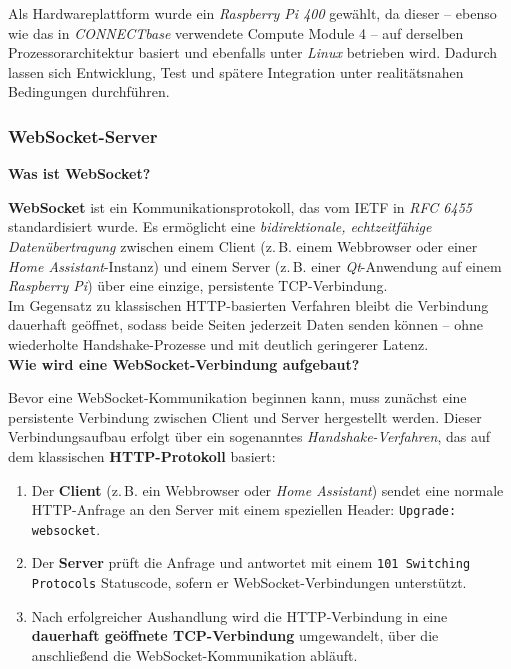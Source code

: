 Als Hardwareplattform wurde ein \textit{Raspberry Pi 400} gewählt, da dieser – ebenso wie das in \textit{CONNECTbase} verwendete Compute Module 4 – auf derselben Prozessorarchitektur basiert und ebenfalls unter \textit{Linux} betrieben wird. Dadurch lassen sich Entwicklung, Test und spätere Integration unter realitätsnahen Bedingungen durchführen.

\subsubsection{WebSocket-Server}

{\large \textbf{Was ist WebSocket?}} 

\textbf{WebSocket} ist ein Kommunikationsprotokoll, das vom IETF in \textit{RFC 6455} standardisiert wurde. Es ermöglicht eine \textit{bidirektionale, echtzeitfähige Datenübertragung} zwischen einem Client (z.\,B. einem Webbrowser oder einer \textit{Home Assistant}-Instanz) und einem Server (z.\,B. einer \textit{Qt}-Anwendung auf einem \textit{Raspberry Pi}) über eine einzige, persistente TCP-Verbindung.\\
Im Gegensatz zu klassischen HTTP-basierten Verfahren bleibt die Verbindung dauerhaft geöffnet, sodass beide Seiten jederzeit Daten senden können – ohne wiederholte Handshake-Prozesse und mit deutlich geringerer Latenz.\\

{\large \textbf{Wie wird eine WebSocket-Verbindung aufgebaut?}}

Bevor eine WebSocket-Kommunikation beginnen kann, muss zunächst eine persistente Verbindung zwischen Client und Server hergestellt werden. Dieser Verbindungsaufbau erfolgt über ein sogenanntes \textit{Handshake-Verfahren}, das auf dem klassischen \textbf{HTTP-Protokoll} basiert:

\begin{enumerate}
    \item Der \textbf{Client} (z.\,B. ein Webbrowser oder \textit{Home Assistant}) sendet eine normale HTTP-Anfrage an den Server mit einem speziellen Header: \texttt{Upgrade: websocket}.\\
    \item Der \textbf{Server} prüft die Anfrage und antwortet mit einem \texttt{101 Switching Protocols} Statuscode, sofern er WebSocket-Verbindungen unterstützt.\\
    \item Nach erfolgreicher Aushandlung wird die HTTP-Verbindung in eine \textbf{dauerhaft geöffnete TCP-Verbindung} umgewandelt, über die anschließend die WebSocket-Kommunikation abläuft.
\end{enumerate}

